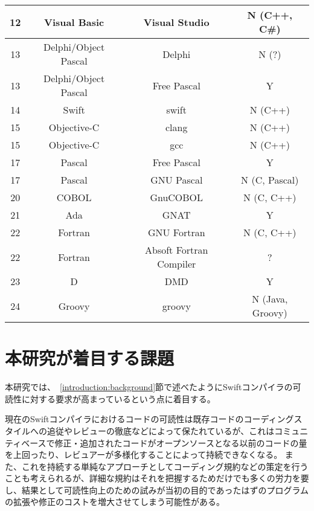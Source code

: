 \begin{table}[hb]
\begin{center}
\begin{tabular}{|c|c|c|c|}
            \hline
            12 & Visual Basic & Visual Studio & N (C++, C\#) \\
            \hline
            13 & Delphi/Object Pascal & Delphi & N (?) \\
            \hline
            13 & Delphi/Object Pascal & Free Pascal & Y \\
            \hline
            14 & Swift & swift & N (C++) \\
            \hline
            15 & Objective-C & clang & N (C++) \\
            \hline
            15 & Objective-C & gcc & N (C++) \\
            \hline
            17 & Pascal & Free Pascal & Y \\
            \hline
            17 & Pascal & GNU Pascal & N (C, Pascal) \\
            \hline
            20 & COBOL & GnuCOBOL & N (C, C++) \\
            \hline
            21 & Ada & GNAT & Y \\
            \hline
            22 & Fortran & GNU Fortran & N (C, C++) \\
            \hline
            22 & Fortran & Absoft Fortran Compiler & ? \\
            \hline
            23 & D & DMD & Y \\
            \hline
            24 & Groovy & groovy & N (Java, Groovy) \\
            \hline
        \end{tabular}
        \label{table:bootstrapping-languages}
    \end{center}
\end{table}


\section{本研究が着目する課題}
\label{introduction:issue}

本研究では、~\ref{introduction:background}節で述べたようにSwiftコンパイラの可読性に対する要求が高まっているという点に着目する。

現在のSwiftコンパイラにおけるコードの可読性は既存コードのコーディングスタイルへの追従やレビューの徹底などによって保たれているが、これはコミュニティベースで修正・追加されたコードがオープンソースとなる以前のコードの量を上回ったり、レビュアーが多様化することによって持続できなくなる。
また、これを持続する単純なアプローチとしてコーディング規約などの策定を行うことも考えられるが、詳細な規約はそれを把握するためだけでも多くの労力を要し、結果として可読性向上のための試みが当初の目的であったはずのプログラムの拡張や修正のコストを増大させてしまう可能性がある。


